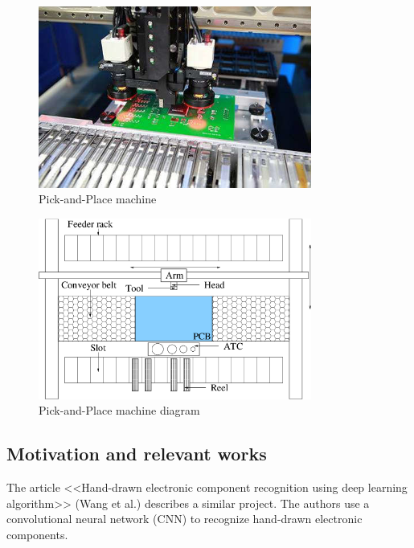\documentclass[preprint,12pt,3p,times]{elsarticle}
\begin{document}
\begin{minipage}[h]{0.48\textwidth}
	\centering
	\begin{figure}[H]
		\centering
		\includegraphics[width=0.8\textwidth]{images/pickandplace.png}
		\caption{Pick-and-Place machine \cite{pickandplace}}
		\label{fig:pick_and_place}
	\end{figure}
\end{minipage}%
\hfill
\begin{minipage}[h]{0.48\textwidth}
	\begin{figure}[H]
		\centering
		\includegraphics[width=0.8\textwidth]{images/pickandplace-diagram.png}
		\caption{Pick-and-Place machine diagram \cite{pickandplace2}}
		\label{fig:pick_and_place_diagram}
	\end{figure}
\end{minipage}

\subsection{Motivation and relevant works}
The article <<Hand-drawn electronic component recognition using deep learning algorithm>> (Wang et al.) \cite{HandDrawnRecognition} describes a similar project. The authors use a convolutional neural network (CNN) to recognize hand-drawn electronic components.
\end{document}
